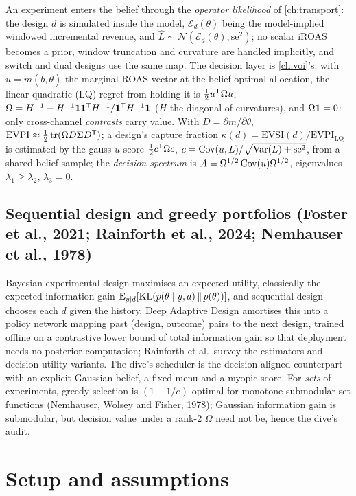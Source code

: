 An experiment enters the belief through the \emph{operator likelihood} of \cref{ch:transport}: the design $d$ is simulated inside the model, $\mathcal E_d(\theta)$ being the model-implied windowed incremental revenue, and $\hat L \sim \mathcal N(\mathcal E_d(\theta),\mathrm{se}^2)$; no scalar iROAS becomes a prior, window truncation and curvature are handled implicitly, and switch and dual designs use the same map. The decision layer is \cref{ch:voi}'s: with $u = m(\bar b,\theta)$ the marginal-ROAS vector at the belief-optimal allocation, the linear-quadratic (LQ) regret from holding it is $\tfrac12u^{\mathsf{T}}\Omega u$, $\Omega = H^{-1} - H^{-1}\mathbf{1}\mathbf{1}^{\mathsf{T}} H^{-1}/\mathbf{1}^{\mathsf{T}} H^{-1}\mathbf{1}$ ($H$ the diagonal of curvatures), and $\Omega\mathbf{1} = 0$: only cross-channel \emph{contrasts} carry value. With $D = \partial m/\partial\theta$, $\mathrm{EVPI} \approx \tfrac12\operatorname{tr}(\Omega D\Sigma D^{\mathsf{T}})$; a design's capture fraction $\kappa(d) = \mathrm{EVSI}(d)/\mathrm{EVPI}_{\mathrm{LQ}}$ is estimated by the gauss-$u$ score $\tfrac12c^{\mathsf{T}}\Omega c$, $c = \operatorname{Cov}(u,L)/\sqrt{\operatorname{Var}(L) + \mathrm{se}^2}$, from a shared belief sample; the \emph{decision spectrum} is $A = \Omega^{1/2}\operatorname{Cov}(u)\Omega^{1/2}$, eigenvalues $\lambda_1 \ge \lambda_2$, $\lambda_3 = 0$.

\subsection{Sequential design and greedy portfolios (Foster et al., 2021; Rainforth et al., 2024; Nemhauser et al., 1978)}

Bayesian experimental design maximises an expected utility, classically the expected information gain $\mathbb{E}_{y\mid d}[\mathrm{KL}(p(\theta\mid y,d)\,\|\,p(\theta))]$, and sequential design chooses each $d$ given the history. Deep Adaptive Design amortises this into a policy network mapping past (design, outcome) pairs to the next design, trained offline on a contrastive lower bound of total information gain so that deployment needs no posterior computation; Rainforth et al.\ survey the estimators and decision-utility variants. The dive's scheduler is the decision-aligned counterpart with an explicit Gaussian belief, a fixed menu and a myopic score. For \emph{sets} of experiments, greedy selection is $(1-1/e)$-optimal for monotone submodular set functions (Nemhauser, Wolsey and Fisher, 1978); Gaussian information gain is submodular, but decision value under a rank-2 $\Omega$ need not be, hence the dive's audit.

\section{Setup and assumptions}

